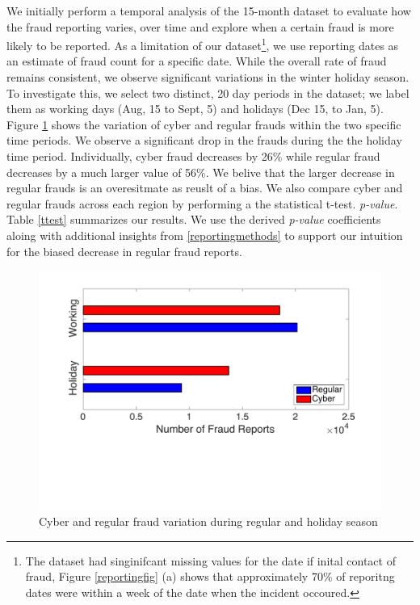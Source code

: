 \documentclass[conference]{IEEEtran}
\begin{document}
We initially perform a temporal analysis of the 15-month dataset to evaluate how the fraud reporting varies, over time and explore when a certain fraud is more likely to be reported. As a limitation of our dataset\footnote{The dataset had singinifcant missing values for the date if inital contact of fraud, Figure \ref{reportingfig} (a) shows that approximately 70\% of reporitng dates were within a week of the date when the incident occoured.}, we use reporting dates as an estimate of fraud count for a specific date. While the overall rate of fraud remains consistent, we observe significant variations in the winter holiday season. To investigate this, we select two distinct, 20 day periods in the dataset; we label them as working days (Aug, 15  to Sept, 5) and holidays (Dec 15, to Jan, 5). Figure \ref{temporal} shows the variation of cyber and regular frauds within the two specific time periods. We observe a significant drop in the frauds during the the holiday time period. Individually, cyber fraud decreases by 26\% while  regular fraud decreases by a much larger value of 56\%. We belive that the larger decrease in regular frauds is an overesitmate as reuslt of a bias. We also compare cyber and regular frauds across each region by performing a the statistical t-test. \emph{p-value}. Table \ref{ttest} summarizes our results. We use the derived \emph{p-value} coefficients aloing with additional insights from \ref{reportingmethods} to support our intuition for the biased decrease in regular fraud reports.

\begin{figure}[t]
\centering
  \includegraphics[scale=0.35]{graphics/reg_vs_holiday.pdf}
  \caption{Cyber and regular fraud variation during regular and holiday season}
  \label{temporal}
\end{figure}
\end{document}
